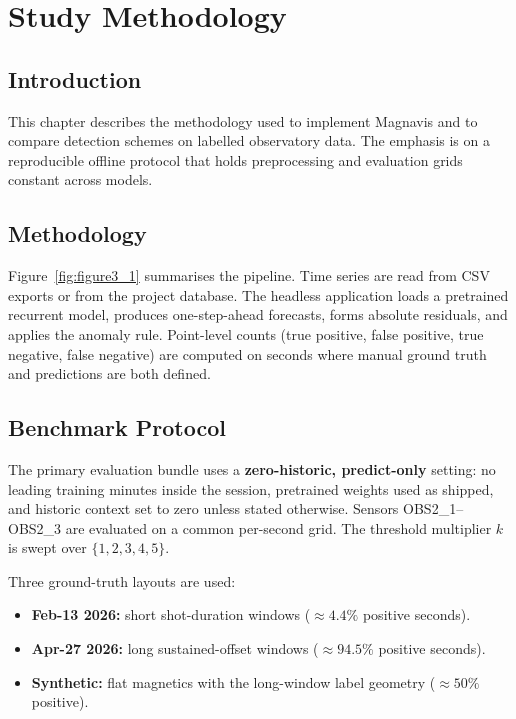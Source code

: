 \chapter{Study Methodology}\doublespacing
\label{Chapter3}

\section{Introduction}
This chapter describes the methodology used to implement Magnavis and to compare detection schemes on labelled observatory data. The emphasis is on a reproducible offline protocol that holds preprocessing and evaluation grids constant across models.

\section{Methodology}
Figure~\ref{fig:figure3_1} summarises the pipeline. Time series are read from CSV exports or from the project database. The headless application loads a pretrained recurrent model, produces one-step-ahead forecasts, forms absolute residuals, and applies the anomaly rule. Point-level counts (true positive, false positive, true negative, false negative) are computed on seconds where manual ground truth and predictions are both defined.



\section{Benchmark Protocol}
The primary evaluation bundle uses a \textbf{zero-historic, predict-only} setting: no leading training minutes inside the session, pretrained weights used as shipped, and historic context set to zero unless stated otherwise. Sensors OBS2\_1--OBS2\_3 are evaluated on a common per-second grid. The threshold multiplier $k$ is swept over $\{1,2,3,4,5\}$.

Three ground-truth layouts are used:
\begin{itemize}
    \item \textbf{Feb-13 2026:} short shot-duration windows ($\approx 4.4\%$ positive seconds).
    \item \textbf{Apr-27 2026:} long sustained-offset windows ($\approx 94.5\%$ positive seconds).
    \item \textbf{Synthetic:} flat magnetics with the long-window label geometry ($\approx 50\%$ positive).
\end{itemize}

